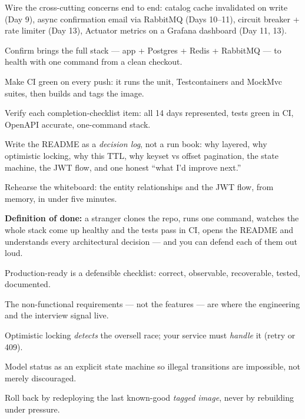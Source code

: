 \begin{buildalong}
\begin{wbitem}
  \item Wire the cross-cutting concerns end to end: catalog cache invalidated on write (Day 9), async confirmation email via RabbitMQ (Days 10--11), circuit breaker + rate limiter (Day 13), Actuator metrics on a Grafana dashboard (Day 11, 13).
  \item Confirm  brings the full stack --- app + Postgres + Redis + RabbitMQ --- to health with one command from a clean checkout.
  \item Make CI green on every push: it runs the unit, Testcontainers and MockMvc suites, then builds and tags the image.
  \item Verify each completion-checklist item: all 14 days represented, tests green in CI, OpenAPI accurate, one-command stack.
  \item Write the README as a \emph{decision log}, not a run book: why layered, why optimistic locking, why this TTL, why keyset vs offset pagination, the state machine, the JWT flow, and one honest ``what I'd improve next.''
  \item Rehearse the whiteboard: the entity relationships and the JWT flow, from memory, in under five minutes.
\end{wbitem}
\smallskip\textbf{Definition of done:} a stranger clones the repo, runs one command, watches the whole stack come up healthy and the tests pass in CI, opens the README and understands every architectural decision --- and you can defend each of them out loud.
\end{buildalong}


\begin{tickcheck}
  \item Production-ready is a defensible checklist: correct, observable, recoverable, tested, documented.
  \item The non-functional requirements --- not the features --- are where the engineering and the interview signal live.
  \item Optimistic locking \emph{detects} the oversell race; your service must \emph{handle} it (retry or 409).
  \item Model status as an explicit state machine so illegal transitions are impossible, not merely discouraged.
  \item Roll back by redeploying the last known-good \emph{tagged image}, never by rebuilding under pressure.
\end{tickcheck}


